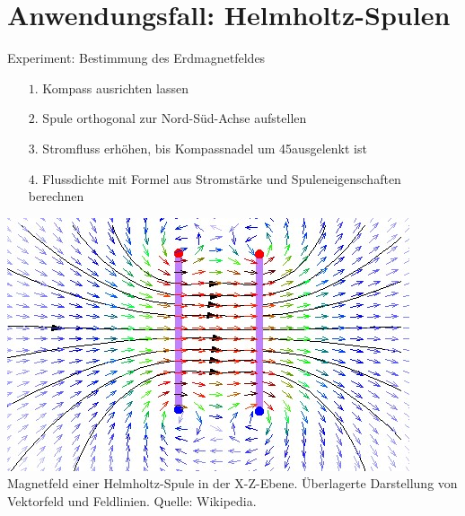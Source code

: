 \part{Anwendungsfall: Helmholtz-Spulen}
\label{part:physics}
\begin{frame}[fragile]{Experiment: Bestimmung des Erdmagnetfeldes}
\begin{minipage}{0.5\textwidth}
	{
\begin{itemize}[itemsep=1mm]
	\item[$1.$] Kompass ausrichten lassen
	\item[$2.$] Spule orthogonal zur Nord-Süd-Achse aufstellen
	\item[$3.$] Stromfluss erhöhen, bis Kompassnadel um 45\degree ausgelenkt ist
	\item[$4.$] Flussdichte mit Formel aus Stromstärke und Spuleneigenschaften berechnen
\end{itemize}
}
\end{minipage}
\begin{minipage}{0.48\textwidth}
	\centering
	\includegraphics[width=\textwidth]{images/Magnetfeld-Helmholtzspule.jpg}
	\tiny Magnetfeld einer Helmholtz-Spule in der X-Z-Ebene. Überlagerte Darstellung von Vektorfeld und Feldlinien. Quelle: Wikipedia.
\end{minipage}
\end{frame}

